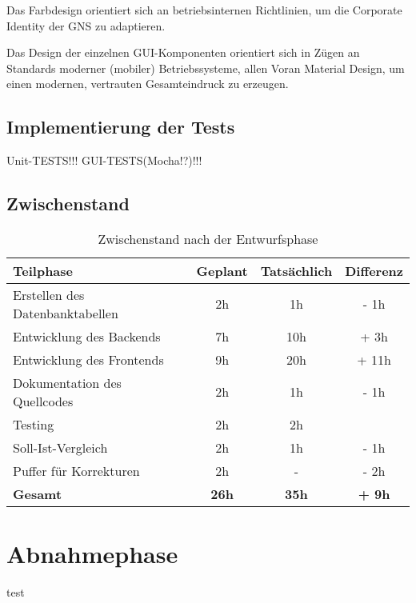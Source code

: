 \documentclass[12pt, xcolor=dvipsnames]{scrartcl}
\begin{document}
Das Farbdesign orientiert sich an betriebsinternen Richtlinien, um die Corporate Identity der GNS zu adaptieren.

Das Design der einzelnen GUI-Komponenten orientiert sich in Zügen an Standards moderner (mobiler) Betriebssysteme, allen Voran Material Design, um einen modernen, vertrauten Gesamteindruck zu erzeugen.

\subsection{Implementierung der Tests}

Unit-TESTS!!! 
GUI-TESTS(Mocha!?)!!!

\subsection{Zwischenstand}

\begin{table}[H]
	\centering
	\begin{tabular}{lccc}

		\rowcolor{white!15}				
		\textbf{Teilphase} & \textbf{Geplant} & \textbf{Tatsächlich} & \textbf{Differenz} \\\hline		
		

		Erstellen des Datenbanktabellen & 2h & 1h & - 1h\\	    
	    Entwicklung des Backends & 7h & 10h & + 3h\\	    
	    Entwicklung des Frontends & 9h & 20h & + 11h\\	     
	    Dokumentation des Quellcodes & 2h & 1h & - 1h \\	      
   	    Testing & 2h & 2h & \\
   	    Soll-Ist-Vergleich & 2h & 1h & - 1h \\
   	    Puffer für Korrekturen & 2h & - & - 2h\\\hline   	    	    	    

		\rowcolor{white!15}				
		\textbf{Gesamt} & \textbf{26h} & \textbf{35h} & \textbf{+ 9h} \\			

	    
	\end{tabular}
	\caption{Zwischenstand nach der Entwurfsphase}
	\label{tab:zwischenstand_entwurfsphase}
	\end{table}

\section{Abnahmephase}
	test
\end{document}

